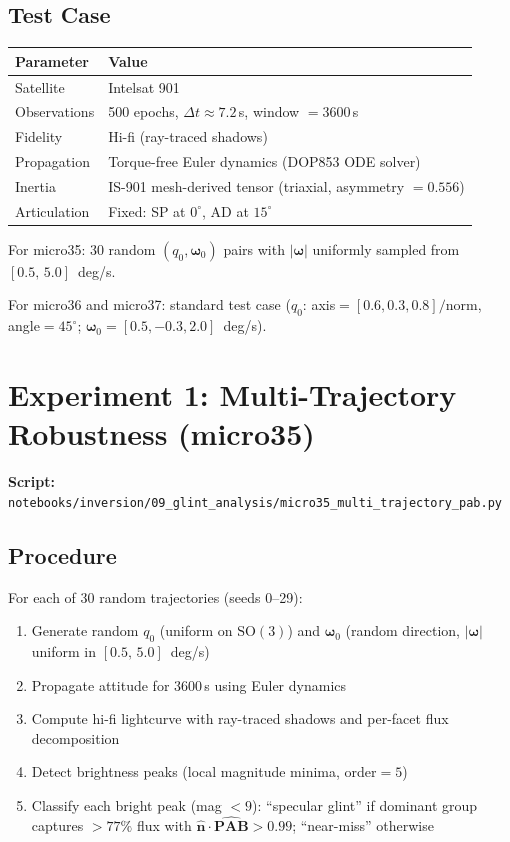 \documentclass[11pt,a4paper]{article}
\begin{document}
\subsection{Test Case}

\begin{table}[H]
\centering
\begin{tabular}{ll}
\toprule
\textbf{Parameter} & \textbf{Value} \\
\midrule
Satellite & Intelsat 901 \\
Observations & 500 epochs, $\Delta t \approx 7.2$\,s, window $= 3600$\,s \\
Fidelity & Hi-fi (ray-traced shadows) \\
Propagation & Torque-free Euler dynamics (DOP853 ODE solver) \\
Inertia & IS-901 mesh-derived tensor (triaxial, asymmetry $= 0.556$) \\
Articulation & Fixed: SP at $0^\circ$, AD at $15^\circ$ \\
\bottomrule
\end{tabular}
\end{table}

For micro35: 30 random $(q_0, \boldsymbol{\omega}_0)$ pairs with $|\boldsymbol{\omega}|$ uniformly sampled from $[0.5,\,5.0]$~deg/s.

For micro36 and micro37: standard test case ($q_0$: axis$=[0.6,0.3,0.8]/\text{norm}$, angle$=45^\circ$; $\boldsymbol{\omega}_0 = [0.5, -0.3, 2.0]$~deg/s).

\section{Experiment 1: Multi-Trajectory Robustness (micro35)}

\textbf{Script:} \texttt{notebooks/inversion/09\_glint\_analysis/micro35\_multi\_trajectory\_pab.py}

\subsection{Procedure}

For each of 30 random trajectories (seeds 0--29):
\begin{enumerate}[leftmargin=2em]
  \item Generate random $q_0$ (uniform on $\mathrm{SO}(3)$) and $\boldsymbol{\omega}_0$ (random direction, $|\boldsymbol{\omega}|$ uniform in $[0.5,\,5.0]$~deg/s)
  \item Propagate attitude for 3600\,s using Euler dynamics
  \item Compute hi-fi lightcurve with ray-traced shadows and per-facet flux decomposition
  \item Detect brightness peaks (local magnitude minima, order$=5$)
  \item Classify each bright peak (mag $< 9$): ``specular glint'' if dominant group captures $>77\%$ flux with $\hat{\mathbf{n}}\cdot\hat{\mathbf{PAB}} > 0.99$; ``near-miss'' otherwise
\end{enumerate}
\end{document}
